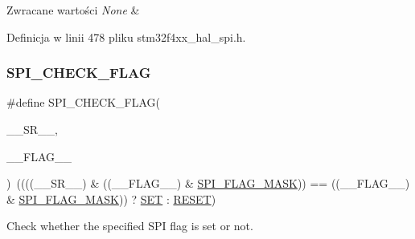\begin{DoxyRetVals}{Zwracane wartości}
{\em None} & \\
\hline
\end{DoxyRetVals}


Definicja w linii 478 pliku stm32f4xx\+\_\+hal\+\_\+spi.\+h.

\mbox{\label{group___s_p_i___private___macros_gae9c6be610681f2142fb012de95e6e59d}} 
\subsubsection{\texorpdfstring{S\+P\+I\+\_\+\+C\+H\+E\+C\+K\+\_\+\+F\+L\+AG}{SPI\_CHECK\_FLAG}}
{\footnotesize\ttfamily \#define S\+P\+I\+\_\+\+C\+H\+E\+C\+K\+\_\+\+F\+L\+AG(\begin{DoxyParamCaption}\item[{}]{\+\_\+\+\_\+\+S\+R\+\_\+\+\_\+,  }\item[{}]{\+\_\+\+\_\+\+F\+L\+A\+G\+\_\+\+\_\+ }\end{DoxyParamCaption})~((((\+\_\+\+\_\+\+S\+R\+\_\+\+\_\+) \& ((\+\_\+\+\_\+\+F\+L\+A\+G\+\_\+\+\_\+) \& \hyperlink{group___s_p_i___flags__definition_ga1b2ed6861d967c5bc45a7e7c9101d33c}{S\+P\+I\+\_\+\+F\+L\+A\+G\+\_\+\+M\+A\+SK})) == ((\+\_\+\+\_\+\+F\+L\+A\+G\+\_\+\+\_\+) \& \hyperlink{group___s_p_i___flags__definition_ga1b2ed6861d967c5bc45a7e7c9101d33c}{S\+P\+I\+\_\+\+F\+L\+A\+G\+\_\+\+M\+A\+SK})) ? \hyperlink{group___exported__types_gga89136caac2e14c55151f527ac02daaffab44c8101cc294c074709ec1b14211792}{S\+ET} \+: \hyperlink{group___exported__types_gga89136caac2e14c55151f527ac02daaffa589b7d94a3d91d145720e2fed0eb3a05}{R\+E\+S\+ET})}



Check whether the specified S\+PI flag is set or not. 



